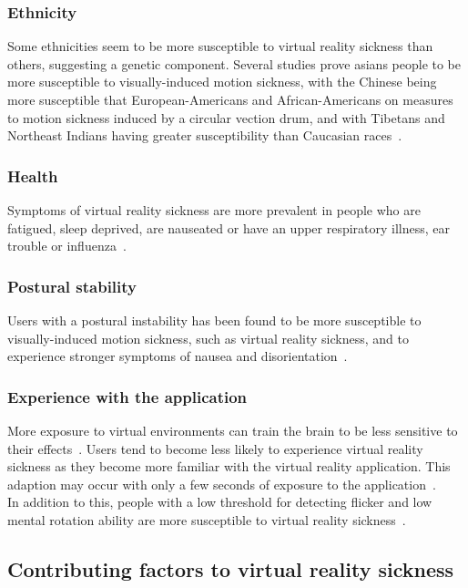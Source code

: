 \subsubsection{Ethnicity}
Some ethnicities seem to be more susceptible to virtual reality sickness than others, suggesting a genetic component. 
Several studies prove asians people to be more susceptible to visually-induced motion sickness,
with the Chinese being more susceptible that European-Americans and African-Americans on measures to motion sickness induced by a circular vection drum, and with
Tibetans and Northeast Indians having greater susceptibility than Caucasian races~\citet{Barrett2004}.

\subsubsection{Health}
Symptoms of virtual reality sickness are more prevalent in people who are fatigued, sleep deprived, are nauseated or have an upper respiratory illness, ear trouble or influenza~\cite{Kolasinski1995}.

\subsubsection{Postural stability}
Users with a postural instability has been found to be more susceptible to visually-induced motion sickness, such as virtual reality sickness, and to experience
stronger symptoms of nausea and disorientation~\cite{Kolasinski1995}. 

\subsubsection{Experience with the application}
More exposure to virtual environments can train the brain to be less sensitive to their effects~\citep{Stanney2003}. Users tend to become less likely to experience
virtual reality sickness as they become more familiar with the virtual reality application. This adaption may occur with only a few seconds of exposure to the application~\cite{Kennedy1985}.\\


In addition to this, people with a low threshold for detecting flicker and low mental rotation ability are more susceptible to virtual reality sickness~\cite{Kolasinski1995}.

\subsection{Contributing factors to virtual reality sickness}






